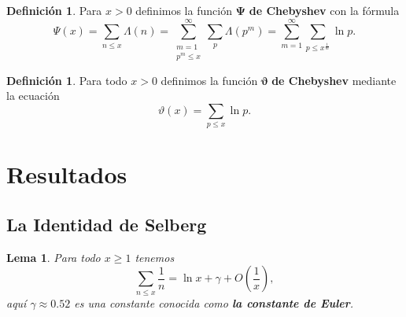 \documentclass[10pt]{article}
\newtheorem{lemma}[theorem]{Lema}
\theoremstyle{definition}
\newtheorem{defn}[theorem]{Definici\'on}
\theoremstyle{remark}
\begin{document}
\begin{defn}
Para $x > 0$ definimos la funci\'on $\boldsymbol{\Psi}$ \textbf{de Chebyshev} con la f\'ormula
\[
\Psi(x) = \sum_{n \leq x} \Lambda(n) 
= \sum_{\substack{m = 1\\p^m \leq x}}^\infty \sum_p \Lambda(p^m)
= \sum_{m = 1}^\infty \sum_{p \leq x^{\frac{1}{m}}} \ln p.
\]
\end{defn}

\begin{defn}
Para todo $x > 0$ definimos la funci\'on $\boldsymbol{\vartheta}$ \textbf{de Chebyshev} mediante la ecuaci\'on
\[
\vartheta(x) = \sum_{p \leq x} \ln p.
\]
\end{defn}

\section{Resultados}

\subsection{La Identidad de Selberg}

\begin{lemma}\label{lem08}
Para todo $x \geq 1$ tenemos
\[
\sum_{n \leq x} \frac{1}{n} = \ln x + \gamma + O\left(\frac{1}{x}\right),
\]
aqu\'i $\gamma \approx 0.52$ es una constante conocida como {\bf la constante de Euler}. 
\end{lemma}
\end{document}
